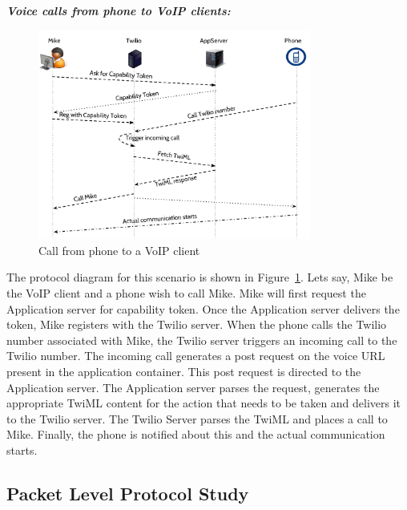 \emph{\textbf{Voice calls from phone to VoIP clients:} }
\begin{figure}[t!] 
\centering
  \includegraphics[width=0.8\textwidth]{figs/p2c.pdf}
\caption{Call from phone to a VoIP client}
\label{fig:callfromphone}
\end{figure}
The protocol diagram for this scenario is shown in Figure~\ref{fig:callfromphone}. Lets say, Mike be the VoIP client and a phone wish to call Mike. Mike will first request the Application server for capability token. Once the Application server delivers the token, Mike registers with the Twilio server. When the phone calls the Twilio number associated with Mike, the Twilio server triggers an incoming call to the Twilio number. The incoming call generates a post request on the voice URL present in the application container. This post request is directed to the Application server. The Application server parses the request, generates the appropriate TwiML content for the action that needs to be taken and delivers it to the Twilio server. The Twilio Server parses the TwiML and places a call to Mike. Finally, the phone is notified about this and the actual communication starts.

\subsection{Packet Level Protocol Study}


